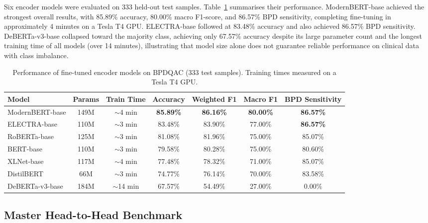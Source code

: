 \documentclass[11pt]{article}
\newcommand{\bpdqac}{BPDQAC}
\begin{document}
Six encoder models were evaluated on 333 held-out test samples.
Table~\ref{tab:encoder_results} summarises their performance. ModernBERT-base achieved the
strongest overall results, with 85.89\% accuracy, 80.00\% macro F1-score, and 86.57\% BPD
sensitivity, completing fine-tuning in approximately 4 minutes on a Tesla T4 GPU. ELECTRA-base
followed at 83.48\% accuracy and also achieved 86.57\% BPD sensitivity. DeBERTa-v3-base
collapsed toward the majority class, achieving only 67.57\% accuracy despite its large parameter
count and the longest training time of all models (over 14 minutes), illustrating that model
size alone does not guarantee reliable performance on clinical data with class imbalance.

\begin{table}[H]
\centering
\caption{Performance of fine-tuned encoder models on \bpdqac{} (333 test samples).
Training times measured on a Tesla T4 GPU.}
\label{tab:encoder_results}
\small
\setlength{\tabcolsep}{4pt}
\renewcommand{\arraystretch}{1.1}
\begin{tabular}{@{}lcccccc@{}}
\toprule
\textbf{Model} & \textbf{Params} & \textbf{Train Time} & \textbf{Accuracy} &
\textbf{Weighted F1} & \textbf{Macro F1} & \textbf{BPD Sensitivity} \\
\midrule
ModernBERT-base  & 149M & $\sim$4 min  & \textbf{85.89\%} & \textbf{86.16\%} &
                                          \textbf{80.00\%} & \textbf{86.57\%} \\
ELECTRA-base     & 110M & $\sim$3 min  & 83.48\% & 83.90\% & 77.00\% & \textbf{86.57\%} \\
RoBERTa-base     & 125M & $\sim$3 min  & 81.08\% & 81.96\% & 75.00\% & 85.07\% \\
BERT-base        & 110M & $\sim$3 min  & 79.58\% & 80.28\% & 75.00\% & 80.60\% \\
XLNet-base       & 117M & $\sim$4 min  & 77.48\% & 78.32\% & 71.00\% & 85.07\% \\
DistilBERT       & 66M  & $\sim$3 min  & 74.77\% & 76.14\% & 70.00\% & 83.58\% \\
DeBERTa-v3-base  & 184M & $\sim$14 min & 67.57\% & 54.49\% & 27.00\% & 0.00\%  \\
\bottomrule
\end{tabular}
\end{table}

\subsection{Master Head-to-Head Benchmark}
\end{document}
